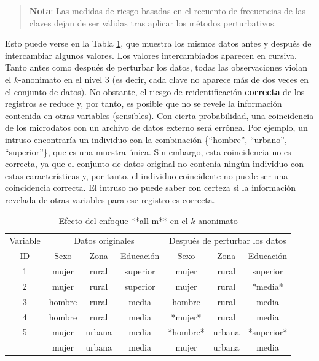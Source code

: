 \documentclass[]{book}
\theoremstyle{definition}
\theoremstyle{definition}
\theoremstyle{definition}
\theoremstyle{definition}
\theoremstyle{remark}
\begin{document}
\begin{quote}
\textbf{Nota}: Las medidas de riesgo basadas en el recuento de frecuencias de las claves dejan de ser válidas tras aplicar los métodos perturbativos.
\end{quote}

Esto puede verse en la Tabla \ref{tab:Tabla12}, que muestra los mismos datos antes y después de intercambiar algunos valores. Los valores intercambiados aparecen en cursiva. Tanto antes como después de perturbar los datos, todas las observaciones violan el \(k\)-anonimato en el nivel 3 (es decir, cada clave no aparece más de dos veces en el conjunto de datos). No obstante, el riesgo de reidentificación \textbf{correcta} de los registros se reduce y, por tanto, es posible que no se revele la información contenida en otras variables (sensibles). Con cierta probabilidad, una coincidencia de los microdatos con un archivo de datos externo será errónea. Por ejemplo, un intruso encontraría un individuo con la combinación \{``hombre'', ``urbano'', ``superior''\}, que es una muestra única. Sin embargo, esta coincidencia no es correcta, ya que el conjunto de datos original no contenía ningún individuo con estas características y, por tanto, el individuo coincidente no puede ser una coincidencia correcta. El intruso no puede saber con certeza si la información revelada de otras variables para ese registro es correcta.

\begin{table}

\caption{\label{tab:Tabla12}\label{tab:Tabla12}Efecto del enfoque **all-m** en el $k$-anonimato}
\centering
\begin{tabular}[t]{ccccccc}
\toprule
\multicolumn{1}{c}{Variable} & \multicolumn{3}{c}{Datos originales} & \multicolumn{3}{c}{Después de perturbar los datos} \\
\cmidrule(l{3pt}r{3pt}){1-1} \cmidrule(l{3pt}r{3pt}){2-4} \cmidrule(l{3pt}r{3pt}){5-7}
ID & Sexo & Zona & Educación & Sexo & Zona & Educación\\
\midrule
1 & mujer & rural & superior & mujer & rural & superior\\
2 & mujer & rural & superior & mujer & rural & *media*\\
3 & hombre & rural & media & hombre & rural & media\\
4 & hombre & rural & media & *mujer* & rural & media\\
5 & mujer & urbana & media & *hombre* & urbana & *superior*\\
\addlinespace
6 & mujer & urbana & media & mujer & urbana & media\\
\bottomrule
\end{tabular}
\end{table}
\end{document}
